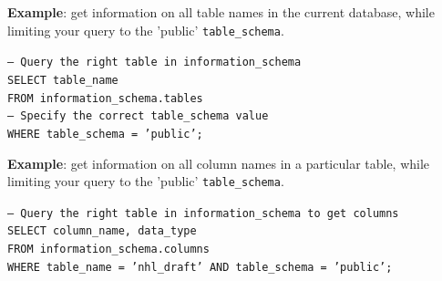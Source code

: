 \documentclass[11pt]{article}
\begin{document}
    \textbf{Example}: get information on all table names in the current database, while limiting your query to the 'public' \texttt{table\_schema}.

    \vspace{5mm}

    \texttt{-- Query the right table in information\_schema \\
    SELECT table\_name \\
    FROM information\_schema.tables \\
    -- Specify the correct table\_schema value \\
    WHERE table\_schema = 'public';}

    \vspace{5mm}

    \textbf{Example}: get information on all column names in a particular table, while limiting your query to the 'public' \texttt{table\_schema}.

    \vspace{5mm}

    \texttt{-- Query the right table in information\_schema to get columns \\
    SELECT column\_name, data\_type \\
    FROM information\_schema.columns \\
    WHERE table\_name = 'nhl\_draft' AND table\_schema = 'public';}

    \medskip
    
    
\end{document}
